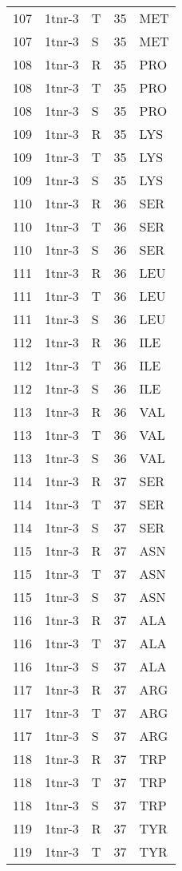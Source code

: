 \begin{tiny}
\begin{longtable}[l]{l|l|l|l|l}
	107 & 1tnr-3 & T & 35 & MET \\
	107 & 1tnr-3 & S & 35 & MET \\
	108 & 1tnr-3 & R & 35 & PRO \\
	108 & 1tnr-3 & T & 35 & PRO \\
	108 & 1tnr-3 & S & 35 & PRO \\
	109 & 1tnr-3 & R & 35 & LYS \\
	109 & 1tnr-3 & T & 35 & LYS \\
	109 & 1tnr-3 & S & 35 & LYS \\
	110 & 1tnr-3 & R & 36 & SER \\
	110 & 1tnr-3 & T & 36 & SER \\
	110 & 1tnr-3 & S & 36 & SER \\
	111 & 1tnr-3 & R & 36 & LEU \\
	111 & 1tnr-3 & T & 36 & LEU \\
	111 & 1tnr-3 & S & 36 & LEU \\
	112 & 1tnr-3 & R & 36 & ILE \\
	112 & 1tnr-3 & T & 36 & ILE \\
	112 & 1tnr-3 & S & 36 & ILE \\
	113 & 1tnr-3 & R & 36 & VAL \\
	113 & 1tnr-3 & T & 36 & VAL \\
	113 & 1tnr-3 & S & 36 & VAL \\
	114 & 1tnr-3 & R & 37 & SER \\
	114 & 1tnr-3 & T & 37 & SER \\
	114 & 1tnr-3 & S & 37 & SER \\
	115 & 1tnr-3 & R & 37 & ASN \\
	115 & 1tnr-3 & T & 37 & ASN \\
	115 & 1tnr-3 & S & 37 & ASN \\
	116 & 1tnr-3 & R & 37 & ALA \\
	116 & 1tnr-3 & T & 37 & ALA \\
	116 & 1tnr-3 & S & 37 & ALA \\
	117 & 1tnr-3 & R & 37 & ARG \\
	117 & 1tnr-3 & T & 37 & ARG \\
	117 & 1tnr-3 & S & 37 & ARG \\
	118 & 1tnr-3 & R & 37 & TRP \\
	118 & 1tnr-3 & T & 37 & TRP \\
	118 & 1tnr-3 & S & 37 & TRP \\
	119 & 1tnr-3 & R & 37 & TYR \\
	119 & 1tnr-3 & T & 37 & TYR \\

\end{longtable}
\end{tiny}

